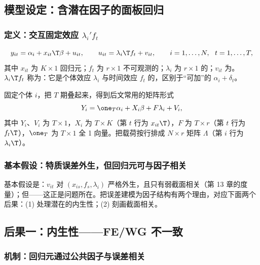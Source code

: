 \subsection{模型设定：含潜在因子的面板回归}

\subsubsection{定义：交互固定效应 \texorpdfstring{$\lambda_i'f_t$}{lambda\_i' f\_t}}

\begin{defn}[含潜在因子的面板模型]\label{def:U14a-model}
\[
y_{it}=\alpha_i+x_{it}\T\beta+u_{it},\qquad u_{it}=\lambda_i\T f_t+v_{it},\qquad i=1,\dots,N,\ \ t=1,\dots,T,
\]
其中 $x_{it}$ 为 $K\times1$ 回归元；$f_t$ 为 $r\times1$ 不可观测的；$\lambda_i$ 为 $r\times1$ 的；$v_{it}$ 为。$\lambda_i\T f_t$ 称为：它是个体效应 $\lambda_i$ 与时间效应 $f_t$ 的，区别于“可加”的 $\alpha_i+\delta_t$。
\end{defn}

固定个体 $i$，把 $T$ 期叠起来，得到后文常用的矩阵形式
\[
Y_i=\one_T\alpha_i+X_i\beta+F\lambda_i+V_i,
\]
其中 $Y_i$、$V_i$ 为 $T\times1$，$X_i$ 为 $T\times K$（第 $t$ 行为 $x_{it}\T$），$F$ 为 $T\times r$（第 $t$ 行为 $f_t\T$），$\one_T$ 为 $T\times1$ 全 1 向量。把载荷按行排成 $N\times r$ 矩阵 $\Lambda$（第 $i$ 行为 $\lambda_i\T$）。

\subsubsection{基本假设：特质误差外生，但回归元可与因子相关}

基本假设是：$v_{it}$ 对 $(x_{is},f_s,\lambda_i)$ 严格外生，且只有弱截面相关（第 13 章的度量）；但——这正是问题所在。把误差建模为因子结构有两个理由，对应下面两个后果：(1) 处理潜在的内生性；(2) 刻画截面相关。

\subsection{后果一：内生性——FE/WG 不一致}

\subsubsection{机制：回归元通过公共因子与误差相关}

